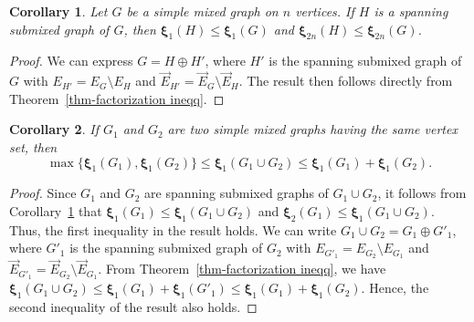 \documentclass[12pt]{article}
\numberwithin{equation}{section}
\newtheorem{cor}{Corollary}[section]
\begin{document}
	\begin{cor}\label{cor-spanning ineqq}
		Let $G$ be a simple mixed graph on $n$ vertices. If $H$ is a spanning submixed graph of $G$, then $\bm{\xi}_{1}(H)\leq\bm{\xi}_{1}(G)$ and $\bm{\xi}_{2n}(H)\leq\bm{\xi}_{2n}(G)$.
	\end{cor}
	\begin{proof}
	We can express  $G=H\oplus H'$, where $H'$ is the spanning submixed graph of $G$ with $E_{H'}=E_G\setminus E_H$ and $\vec{E}_{H'}=\vec{E}_G\setminus \vec{E}_H$. The result then follows directly from Theorem~\ref{thm-factorization ineqq}.
	\end{proof}
	\begin{cor}
		If $G_1$ and $G_2$ are two simple mixed graphs having the same vertex set, then 
		$$\max\{\bm{\xi}_{1}(G_1),\bm{\xi}_{1}(G_2)\}\leq\bm{\xi}_{1}(G_1\cup G_2)\leq\bm{\xi}_{1}(G_1)+\bm{\xi}_{1}(G_2).$$
	\end{cor}
	\begin{proof}
		Since $G_1$ and $G_2$ are spanning submixed graphs of $G_1\cup G_2$, it follows from Corollary~\ref{cor-spanning ineqq} that $\bm{\xi}_{1}(G_1)\leq\bm{\xi}_{1}(G_1\cup G_2)$ and $\bm{\xi}_{2}(G_1)\leq\bm{\xi}_{1}(G_1\cup G_2)$. Thus, the first inequality in the result holds. We can write $G_1\cup G_2=G_1\oplus G'_1$, where $G'_1$ is the spanning submixed graph of $G_2$ with $E_{G'_1}=E_{G_2}\setminus E_{G_1}$ and $\vec{E}_{G'_1}=\vec{E}_{G_2}\setminus \vec{E}_{G_1}$. From Theorem~\ref{thm-factorization ineqq}, we have $\bm{\xi}_{1}(G_1\cup G_2)\leq\bm{\xi}_{1}(G_1)+\bm{\xi}_{1}(G'_1)\leq\bm{\xi}_{1}(G_1)+\bm{\xi}_{1}(G_2)$. Hence, the second inequality of the result also holds.
	\end{proof}
\end{document}
